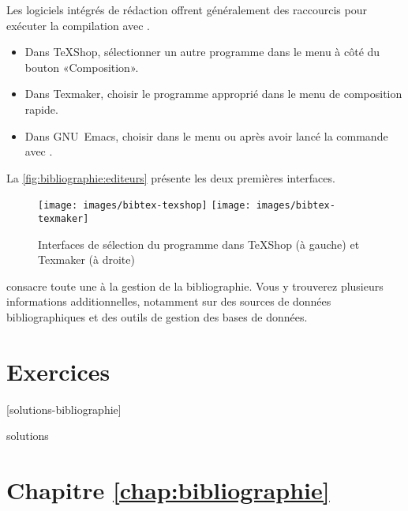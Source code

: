 
Les logiciels intégrés de rédaction offrent généralement des
raccourcis pour exécuter la compilation avec {\BibTeX}.
\begin{itemize}
\item Dans TeXShop, sélectionner un autre programme dans le menu à
  côté du bouton «Composition».
\item Dans Texmaker, choisir le programme approprié dans le menu de
  composition rapide.
\item Dans GNU~Emacs, choisir  dans le menu
   ou après avoir lancé la commande
   avec .
\end{itemize}
La \autoref{fig:bibliographie:editeurs} présente les deux premières
interfaces.

\begin{figure}
  \centering
  \texttt{[image: images/bibtex-texshop]}
  \qquad
  \texttt{[image: images/bibtex-texmaker]}
  \caption[Interfaces de sélection du programme {\BibTeX} dans TeXShop
  et Texmaker]{%
    Interfaces de sélection du programme {\BibTeX} dans TeXShop (à
    gauche) et Texmaker (à droite)}
  \label{fig:bibliographie:editeurs}
\end{figure}

\citeauthor{wikilivres:latex} consacre toute une %
à la gestion de la bibliographie. Vous y trouverez plusieurs
informations additionnelles, notamment sur des sources de données
bibliographiques et des outils de gestion des bases de données.




\section{Exercices}
\label{sec:bibliographie:exercices}

[solutions-bibliographie]

\begin{Filesave}{solutions}
\section*{Chapitre \ref*{chap:bibliographie}}

\end{Filesave}

